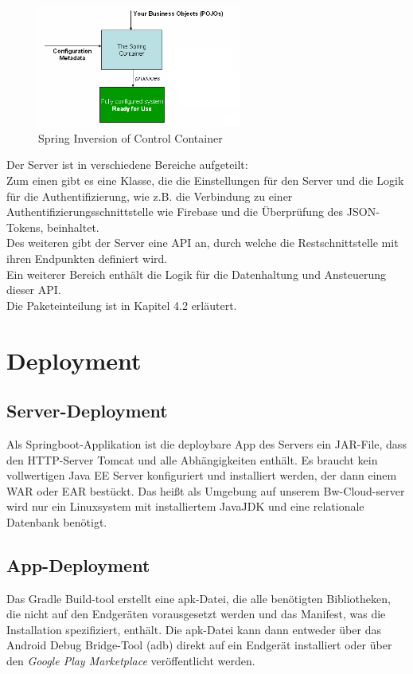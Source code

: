 \begin{figure}[H]
\centering
\includegraphics[width=0.6\textwidth]{pics/spring_ioc_container.png}%
\caption{Spring Inversion of Control Container\cite{SpringCoreTechnologies}}%
\label{cleanarch}%
\end{figure}

Der Server ist in verschiedene Bereiche aufgeteilt: \\
Zum einen gibt es eine Klasse, die die Einstellungen für den Server und die Logik für die Authentifizierung,  wie z.B. die Verbindung zu einer Authentifizierungsschnittstelle wie Firebase und die Überprüfung des JSON-Tokens,  beinhaltet. \\
Des weiteren gibt der Server eine API an, durch welche die Restschnittstelle mit ihren Endpunkten definiert wird. \\
Ein weiterer Bereich enthält die Logik für die Datenhaltung und Ansteuerung dieser API. \\

Die Paketeinteilung ist in Kapitel 4.2 erläutert. 
\section{Deployment}
 
\subsection{Server-Deployment} 
Als Springboot-Applikation ist die deploybare App des Servers ein JAR-File, dass den HTTP-Server Tomcat und alle Abhängigkeiten enthält. Es braucht kein vollwertigen Java EE Server konfiguriert und installiert werden, der dann einem WAR oder EAR bestückt. Das heißt als Umgebung auf unserem Bw-Cloud-server wird nur ein Linuxsystem mit installiertem JavaJDK und eine relationale Datenbank benötigt. 

\subsection{App-Deployment}
Das Gradle Build-tool erstellt eine apk-Datei, die alle benötigten Bibliotheken, die nicht auf den Endgeräten vorausgesetzt werden und das Manifest, was die Installation spezifiziert, enthält. Die apk-Datei kann dann entweder über das Android Debug Bridge-Tool (adb) direkt auf ein Endgerät installiert oder über den {\em Google Play Marketplace} veröffentlicht werden.


